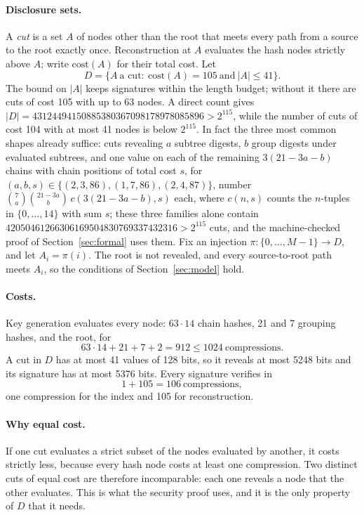 \documentclass[10pt]{article}
\begin{document}
\paragraph{Disclosure sets.}
A \emph{cut} is a set $A$ of nodes other than the root that meets every path from a source to the root exactly once. Reconstruction at $A$ evaluates the hash nodes strictly above $A$; write $\mathrm{cost}(A)$ for their total cost. Let
\[
D=\{A\ \text{a cut}:\ \mathrm{cost}(A)=105\ \text{and}\ |A|\le41\}.
\]
The bound on $|A|$ keeps signatures within the length budget; without it there are cuts of cost 105 with up to 63 nodes. A direct count gives $|D|=43124494150885380367098178978085896>2^{115}$, while the number of cuts of cost 104 with at most 41 nodes is below $2^{115}$. In fact the three most common shapes already suffice: cuts revealing $a$ subtree digests, $b$ group digests under evaluated subtrees, and one value on each of the remaining $3(21-3a-b)$ chains with chain positions of total cost $s$, for $(a,b,s)\in\{(2,3,86),(1,7,86),(2,4,87)\}$, number $\binom7a\binom{21-3a}b\,c(3(21-3a-b),s)$ each, where $c(n,s)$ counts the $n$-tuples in $\{0,\dots,14\}$ with sum $s$; these three families alone contain $42050461266306169504830769337432316>2^{115}$ cuts, and the machine-checked proof of Section~\ref{sec:formal} uses them. Fix an injection $\pi:\{0,\dots,M-1\}\to D$, and let $A_i=\pi(i)$. The root is not revealed, and every source-to-root path meets $A_i$, so the conditions of Section~\ref{sec:model} hold.

\paragraph{Costs.}
Key generation evaluates every node: $63\cdot14$ chain hashes, 21 and 7 grouping hashes, and the root, for
\[
63\cdot14+21+7+2=912\le1024\ \text{compressions}.
\]
A cut in $D$ has at most 41 values of 128 bits, so it reveals at most 5248 bits and its signature has at most 5376 bits. Every signature verifies in
\[
1+105=106\ \text{compressions},
\]
one compression for the index and 105 for reconstruction.

\paragraph{Why equal cost.}
If one cut evaluates a strict subset of the nodes evaluated by another, it costs strictly less, because every hash node costs at least one compression. Two distinct cuts of equal cost are therefore incomparable: each one reveals a node that the other evaluates. This is what the security proof uses, and it is the only property of $D$ that it needs.
\end{document}
